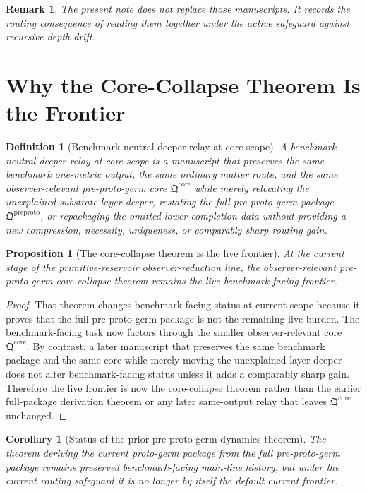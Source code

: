 \documentclass[11pt]{article}
\newcommand{\PreProtoPackage}{\mathfrak Q^{\mathrm{preproto}}}
\newcommand{\PreProtoCore}{\mathfrak Q^{\mathrm{core}}}
\newtheorem{definition}{Definition}
\newtheorem{proposition}{Proposition}
\newtheorem{remark}{Remark}
\newtheorem{corollary}{Corollary}
\begin{document}
\begin{remark}
The present note does not replace those manuscripts. It records the routing consequence of reading them together under the active safeguard against recursive depth drift.
\end{remark}

\section{Why the Core-Collapse Theorem Is the Frontier}

\begin{definition}[Benchmark-neutral deeper relay at core scope]
A \emph{benchmark-neutral deeper relay at core scope} is a manuscript that preserves the same benchmark one-metric output, the same ordinary matter route, and the same observer-relevant pre-proto-germ core \(\PreProtoCore\) while merely relocating the unexplained substrate layer deeper, restating the full pre-proto-germ package \(\PreProtoPackage\), or repackaging the omitted lower completion data without providing a new compression, necessity, uniqueness, or comparably sharp routing gain.
\end{definition}

\begin{proposition}[The core-collapse theorem is the live frontier]
At the current stage of the primitive-reservoir observer-reduction line, the observer-relevant pre-proto-germ core collapse theorem remains the live benchmark-facing frontier.
\end{proposition}

\begin{proof}
That theorem changes benchmark-facing status at current scope because it proves that the full pre-proto-germ package is not the remaining live burden. The benchmark-facing task now factors through the smaller observer-relevant core \(\PreProtoCore\). By contrast, a later manuscript that preserves the same benchmark package and the same core while merely moving the unexplained layer deeper does not alter benchmark-facing status unless it adds a comparably sharp gain. Therefore the live frontier is now the core-collapse theorem rather than the earlier full-package derivation theorem or any later same-output relay that leaves \(\PreProtoCore\) unchanged.
\end{proof}

\begin{corollary}[Status of the prior pre-proto-germ dynamics theorem]
The theorem deriving the current proto-germ package from the full pre-proto-germ package remains preserved benchmark-facing main-line history, but under the current routing safeguard it is no longer by itself the default current frontier.
\end{corollary}
\end{document}
